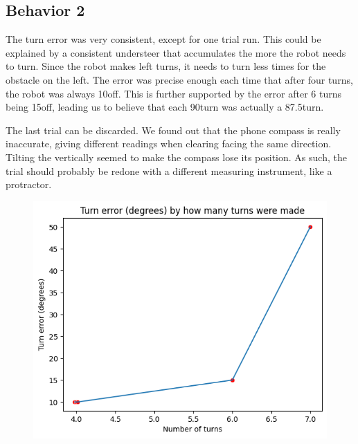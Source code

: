 \documentclass[11pt]{article}
\begin{document}
\subsection*{Behavior 2}

The turn error was very consistent, except for one trial run. This could be explained by a consistent understeer that accumulates the more the robot needs to turn. Since the robot makes left turns, it needs to turn less times for the obstacle on the left. The error was precise enough each time that after four turns, the robot was always 10\degree off. This is further supported by the error after 6 turns being 15\degree off, leading us to believe that each 90\degree  turn was actually a 87.5\degree  turn.

The last trial can be discarded. We found out that the phone compass is really inaccurate, giving different readings when clearing facing the same direction. Tilting the vertically seemed to make the compass lose its position. As such, the trial should probably be redone with a different measuring instrument, like a protractor.

\begin{figure}[h!]
\includegraphics[width=120mm]{behavior2c.png}
\centering
\end{figure}

\end{document}
